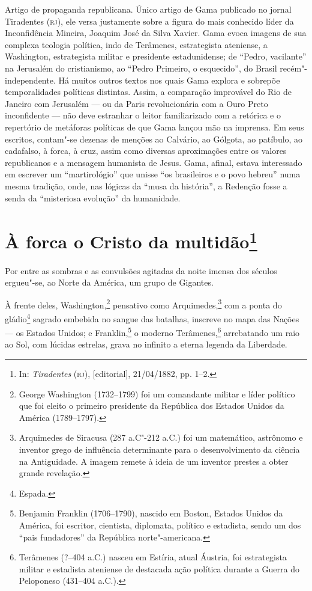 {\small\noindent
Artigo de propaganda republicana. Único artigo de Gama publicado
no jornal Tiradentes (\textsc{rj}), ele versa justamente sobre a figura do mais
conhecido líder da Inconfidência Mineira, Joaquim José da Silva Xavier.
Gama evoca imagens de sua complexa teologia política,
indo de Terâmenes, estrategista ateniense, a
Washington, estrategista militar e presidente estadunidense; de ``Pedro,
vacilante'' na Jerusalém do cristianismo, ao ``Pedro Primeiro, o
esquecido'', do Brasil recém"-independente. Há muitos outros textos nos
quais Gama explora e sobrepõe temporalidades políticas
distintas. Assim, a comparação improvável do Rio de Janeiro com
Jerusalém --- ou da Paris revolucionária com a Ouro
Preto inconfidente --- não deve estranhar o leitor familiarizado com a
retórica e o repertório de metáforas políticas de que Gama lançou mão
na imprensa. Em seus escritos, contam"-se dezenas de
menções ao Calvário, ao Gólgota, ao patíbulo, ao cadafalso, à forca, à
cruz, assim como diversas aproximações entre os valores republicanos e a
mensagem humanista de Jesus. Gama, afinal, estava interessado em
escrever um ``martirológio'' que unisse ``os brasileiros e o povo hebreu''
numa mesma tradição, onde, nas lógicas da ``musa da história'', a Redenção
fosse a senda da ``misteriosa evolução'' da humanidade. }

\chapter{À forca o Cristo da multidão\footnote[*]{In:
  \emph{Tiradentes} (\textsc{rj}), {[}editorial{]}, 21/04/1882, pp. 1--2.}}

Por entre as sombras e as convulsões agitadas da noite imensa dos
séculos ergueu"-se, ao Norte da América, um grupo de Gigantes.

À frente deles, Washington,\footnote{George Washington (1732--1799) foi
  um comandante militar e líder político que foi eleito o primeiro
  presidente da República dos Estados Unidos da América (1789--1797).}
pensativo como Arquimedes,\footnote{Arquimedes de Siracusa (287 a.C"-212
  a.C.) foi um matemático, astrônomo e inventor grego de influência
  determinante para o desenvolvimento da ciência na Antiguidade. A
  imagem remete à ideia de um inventor prestes a obter grande revelação.}
com a ponta do gládio\footnote{Espada.} sagrado embebida no sangue das
batalhas, inscreve no mapa das Nações --- os Estados Unidos; e
Franklin,\footnote{Benjamin Franklin (1706--1790), nascido em Boston,
  Estados Unidos da América, foi escritor, cientista, diplomata,
  político e estadista, sendo um dos ``pais fundadores'' da República
  norte"-americana.} o moderno Terâmenes,\footnote{Terâmenes (?--404
  a.C.) nasceu em Estíria, atual Áustria, foi estrategista militar e
  estadista ateniense de destacada ação política durante a Guerra do
  Peloponeso (431--404 a.C.).} arrebatando um raio ao Sol, com
lúcidas estrelas, grava no infinito a eterna legenda da Liberdade.

